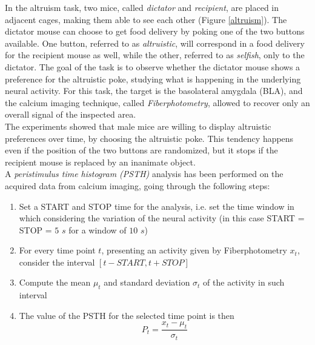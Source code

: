 \documentclass[11pt,a4paper,twocolumn]{article}
\begin{document}
In the altruism task, two mice, called \textit{dictator} and \textit{recipient}, are placed in adjacent cages, making them able to see each other (Figure \ref{altruism}). The dictator mouse can choose to get food delivery by poking one of the two buttons available. One button, referred to as \textit{altruistic}, will correspond in a food delivery for the recipient mouse as well, while the other, referred to as \textit{selfish}, only to the dictator. The goal of the task is to observe whether the dictator mouse shows a preference for the altruistic poke, studying what is happening in the underlying neural activity. For this task, the target is the basolateral amygdala (BLA), and the calcium imaging technique, called \textit{Fiberphotometry}, allowed to recover only an overall signal of the inspected area.\\
The experiments showed that male mice are willing to display altruistic preferences over time, by choosing the altruistic poke. This tendency happens even if the position of the two buttons are randomized, but it stops if the recipient mouse is replaced by an inanimate object.\\
A \textit{peristimulus time histogram (PSTH)} analysis has been performed on the acquired data from calcium imaging, going through the following steps:
\begin{enumerate}
	
	\item Set a START and STOP time for the analysis, i.e. set the time window in which considering the variation of the neural activity (in this case START = STOP = $5$ $s$ for a window of $10$ $s$)
	
	\item For every time point $t$, presenting an activity given by Fiberphotometry $x_t$, consider the interval $[t-START , t+STOP]$
	
	\item Compute the mean $ \mu_t$ and standard deviation $\sigma_t$ of the activity in such interval
	
	\item The value of the PSTH for the selected time point is then
	$$ P_t = \frac{x_t - \mu_t}{\sigma_t}$$
\end{enumerate}
\end{document}
